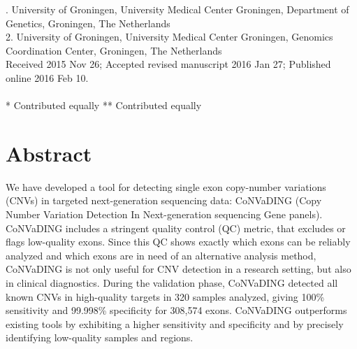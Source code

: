 . University of Groningen, University Medical Center Groningen, Department of Genetics, Groningen, The Netherlands\\
2. University of Groningen, University Medical Center Groningen, Genomics Coordination Center, Groningen, The Netherlands\\


\noindent
Received 2015 Nov 26; Accepted revised manuscript 2016 Jan 27; Published online 2016 Feb 10.
\\~\\
* Contributed equally
** Contributed equally

\section*{Abstract}\label{abstract}
We have developed a tool for detecting single exon copy-number variations (CNVs) in targeted next-generation sequencing data: CoNVaDING (Copy Number Variation Detection In Next-generation sequencing Gene panels).
CoNVaDING includes a stringent quality control (QC) metric, that excludes or flags low-quality exons. 
Since this QC shows exactly which exons can be reliably analyzed and which exons are in need of an alternative analysis method, CoNVaDING is not only useful for CNV detection in a research setting, but also in clinical diagnostics. 
During the validation phase, CoNVaDING detected all known CNVs in high-quality targets in 320 samples analyzed, giving 100\% sensitivity and 99.998\% specificity for 308,574 exons. 
CoNVaDING outperforms existing tools by exhibiting a higher sensitivity and specificity and by precisely identifying low-quality samples and regions. 

